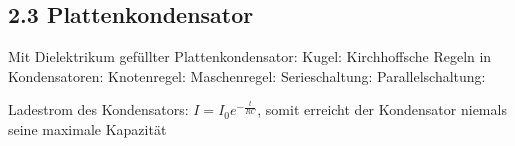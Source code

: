 \subsection*{2.3 Plattenkondensator}
    Mit Dielektrikum gefüllter Plattenkondensator:
    Kugel:
    Kirchhoffsche Regeln in Kondensatoren:
    Knotenregel:
    Maschenregel:
    Serieschaltung:
    Parallelschaltung:

    Ladestrom des Kondensators: $I = I_0 e^{-\frac{t}{RC}}$, somit erreicht der Kondensator niemals seine maximale Kapazität